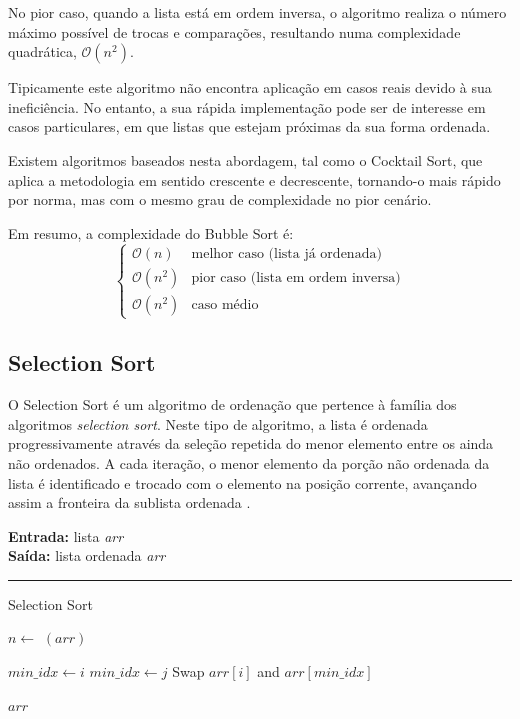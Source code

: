 \documentclass[conference]{IEEEtran}
\begin{document}
No pior caso, quando a lista está em ordem inversa, o algoritmo realiza o número máximo possível de trocas e comparações, resultando numa complexidade quadrática, $\mathcal{O}(n^2)$.


Tipicamente este algoritmo não encontra aplicação em casos reais devido à sua ineficiência. No entanto, a sua rápida implementação pode ser de interesse em casos particulares, em que listas que estejam próximas da sua forma ordenada.

Existem algoritmos baseados nesta abordagem, tal como o Cocktail Sort, que aplica a metodologia em sentido crescente e decrescente, tornando-o mais rápido por norma, mas com o mesmo grau de complexidade no pior cenário.

Em resumo, a complexidade do Bubble Sort é:
\[
\begin{cases}
\mathcal{O}(n) & \text{melhor caso (lista já ordenada)} \\
\mathcal{O}(n^2) & \text{pior caso (lista em ordem inversa)} \\
\mathcal{O}(n^2) & \text{caso médio}
\end{cases}
\]

\subsection{Selection Sort}

O Selection Sort é um algoritmo de ordenação que pertence à família dos algoritmos \textit{selection sort}. Neste tipo de algoritmo, a lista é ordenada progressivamente através da seleção repetida do menor elemento entre os ainda não ordenados. A cada iteração, o menor elemento da porção não ordenada da lista é identificado e trocado com o elemento na posição corrente, avançando assim a fronteira da sublista ordenada \cite{purnomo2023theoretical}.

\begin{algorithm}[H]
    \raggedright
    \vspace{.1em}
    \textbf{Entrada:} lista \textit{arr} \\
    \textbf{Saída:} lista ordenada \textit{arr} \\
    \vspace{.5em}
    \hrule 
    \caption{Selection Sort}
    \begin{algorithmic}[1]
        \State $n \gets$ $(arr)$
    
            \State $min\_idx \gets i$
                    \State $min\_idx \gets j$
                \EndIf
            \EndFor
                \State Swap $arr[i]$ and $arr[min\_idx]$
            \EndIf
        \EndFor
    
        \State \Return $arr$
    \end{algorithmic}
\end{algorithm}
\end{document}
